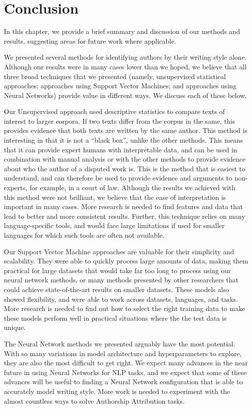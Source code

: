 \chapter{Conclusion}

In this chapter, we provide a brief summary and discussion of our methods and results, suggesting areas for future work where applicable.

We presented several methods for identifying authors by their writing style alone. Although our results were in many cases lower than we hoped, we believe that all three broad techniques that we presented (namely, unsupervised statistical approaches; approaches using Support Vector Machines; and approaches using Neural Networks) provide value in different ways. We discuss each of these below.

Our Unsupervised approach used descriptive statistics to compare texts of interest to larger corpora. If two texts differ from the corpus in the same, this provides evidence that both texts are written by the same author. This method is interesting in that it is not a ``black box'', unlike the other methods. This means that it can provide expert humans with interpretable data, and can be used in combination with manual analysis or with the other methods to provide evidence about who the author of a disputed work is. This is the method that is easiest to understand, and can therefore be used to provide evidence and arguments to non-experts, for example, in a court of law. Although the results we achieved with this method were not brilliant, we believe that the ease of interpretation is important in many cases. More research is needed to find features and data that lead to better and more consistent results. Further, this technique relies on many language-specific tools, and would face large limitations if used for smaller languages for which such tools are often not available.

Our Support Vector Machine approaches are valuable for their simplicity and scalability. They were able to quickly process large amounts of data, making them practical for large datasets that would take far too long to process using our neural network methods, or many methods presented by other researchers that could achieve state-of-the-art results on smaller datasets. These models also showed flexibility, and were able to work across datasets, languages, and tasks. More research is needed to find out how to select the right training data to make these models perform well in practical situations where the the test data is unique.

The Neural Network methods we presented arguably have the most potential. With so many variations in model architecture and hyperparameters to explore, they are also the most difficult to get right. We expect many advances in the near future in using Neural Networks for NLP tasks, and we expect that some of these advances will be useful to finding a Neural Network configuration that is able to accurately model writing style. More work is needed to experiment with the almost countless ways to solve Authorship Attribution tasks.
\label{chap:con}
